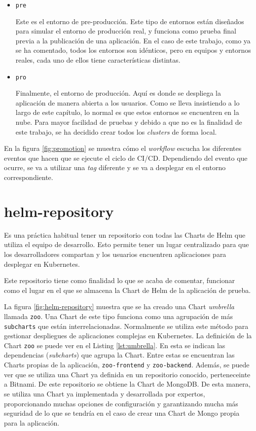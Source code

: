 \begin{itemize}
  \item \texttt{pre}

    Este es el entorno de pre-producción. Este tipo de entornos están diseñados para simular el entorno de producción real, y funciona como prueba final previa a la publicación de una aplicación. En el caso de este trabajo, como ya se ha comentado, todos los entornos son idénticos, pero en equipos y entornos reales, cada uno de ellos tiene características distintas.

  \item \texttt{pro}

    Finalmente, el entorno de producción. Aquí es donde se despliega la aplicación de manera abierta a los usuarios. Como se lleva insistiendo a lo largo de este capítulo, lo normal es que estos entornos se encuentren en la nube. Para mayor facilidad de pruebas y debido a que no es la finalidad de este trabajo, se ha decidido crear todos los \textit{clusters} de forma local.

\end{itemize}

En la figura \ref{fig:promotion} se muestra cómo el \textit{workflow} escucha los diferentes eventos que hacen que se ejecute el ciclo de CI/CD. Dependiendo del evento que ocurre, se va a utilizar una \textit{tag} diferente y se va a desplegar en el entorno correspondiente.

\section{helm-repository}
\label{subsec:helm}

Es una práctica habitual tener un repositorio con todas las Charts de Helm que utiliza el equipo de desarrollo. Esto permite tener un lugar centralizado para que los desarrolladores compartan y los usuarios encuentren aplicaciones para desplegar en Kubernetes.

Este repositorio tiene como finalidad lo que se acaba de comentar, funcionar como el lugar en el que se almacena la Chart de Helm de la aplicación de prueba.

La figura \ref{fig:helm-repository} muestra que se ha creado una Chart \textit{umbrella} llamada \texttt{zoo}. Una Chart de este tipo funciona como una agrupación de más \texttt{subcharts} que están interrelacionadas. Normalmente se utiliza este método para gestionar despliegues de aplicaciones complejas en Kubernetes.
La definición de la Chart \texttt{zoo} se puede ver en el Listing \ref{lst:umbrella}. En esta se indican las dependencias (\textit{subcharts}) que agrupa la Chart. Entre estas se encuentran las Charts propias de la aplicación, \texttt{zoo-frontend} y \texttt{zoo-backend}. Además, se puede ver que se utiliza una Chart ya definida en un repositorio conocido, perteneceinte a Bitnami\cite{bitnami}. De este repositorio se obtiene la Chart de MongoDB. De esta manera, se utiliza una Chart ya implementada y desarrollada por expertos, proporcionando muchas opciones de configuración y garantizando mucha más seguridad de lo que se tendría en el caso de crear una Chart de Mongo propia para la aplicación.

